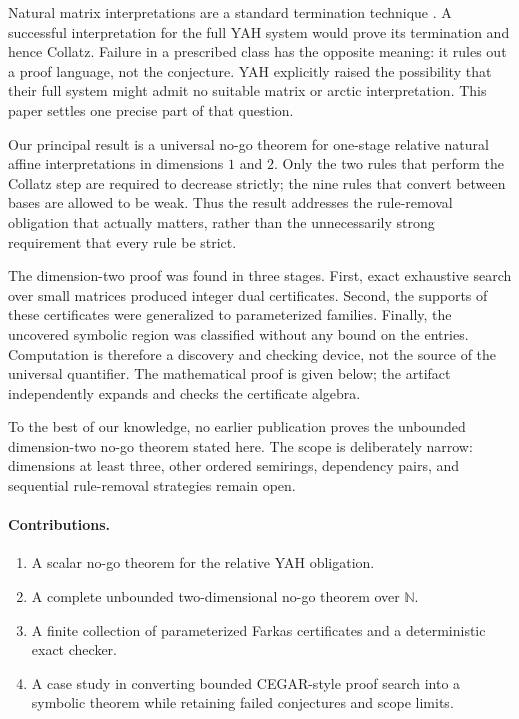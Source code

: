 \documentclass[11pt]{article}
\theoremstyle{definition}
\newcommand{\N}{\mathbb{N}}
\begin{document}
Natural matrix interpretations are a standard termination technique
\cite{endmat,zantema}.  A successful interpretation for the full YAH system
would prove its termination and hence Collatz.  Failure in a prescribed
class has the opposite meaning: it rules out a proof language, not the
conjecture.  YAH explicitly raised the possibility that their full system
might admit no suitable matrix or arctic interpretation.  This paper
settles one precise part of that question.

Our principal result is a universal no-go theorem for one-stage relative
natural affine interpretations in dimensions $1$ and $2$.  Only the two
rules that perform the Collatz step are required to decrease strictly; the
nine rules that convert between bases are allowed to be weak.  Thus the
result addresses the rule-removal obligation that actually matters, rather
than the unnecessarily strong requirement that every rule be strict.

The dimension-two proof was found in three stages.  First, exact exhaustive
search over small matrices produced integer dual certificates.  Second,
the supports of these certificates were generalized to parameterized
families.  Finally, the uncovered symbolic region was classified without
any bound on the entries.  Computation is therefore a discovery and checking
device, not the source of the universal quantifier.  The mathematical proof
is given below; the artifact independently expands and checks the
certificate algebra.

To the best of our knowledge, no earlier publication proves the unbounded
dimension-two no-go theorem stated here.  The scope is deliberately narrow:
dimensions at least three, other ordered semirings, dependency pairs, and
sequential rule-removal strategies remain open.

\paragraph{Contributions.}
\begin{enumerate}[leftmargin=*]
  \item A scalar no-go theorem for the relative YAH obligation.
  \item A complete unbounded two-dimensional no-go theorem over $\N$.
  \item A finite collection of parameterized Farkas certificates and a
        deterministic exact checker.
  \item A case study in converting bounded CEGAR-style proof search into a
        symbolic theorem while retaining failed conjectures and scope limits.
\end{enumerate}
\end{document}
